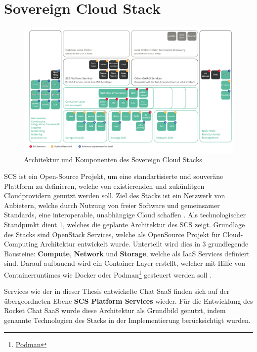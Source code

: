\section{Sovereign Cloud Stack}
\label{sec:gaia-x-einbettung:scs}

\begin{figure}[h]
  \centering
  \includegraphics[height=0.71\textwidth]{gfx/chapters/4_gaia-X/scs_architecture.png}
  \caption{Architektur und Komponenten des Sovereign Cloud Stacks}
  \label{fig:scs_architecture}
\end{figure}

\ac{SCS} ist ein Open-Source Projekt, um eine standartisierte und souveräne Plattform zu definieren, welche von 
existierenden und zukünfitgen Cloudprovidern genutzt werden soll. 
Ziel des Stacks ist ein Netzwerk von Anbietern, welche durch Nutzung von freier Software und gemeinsamer Standards,
eine interoperable, unabhängige Cloud schaffen \cite{Kagermann2021}.
Als technologischer Standpunkt dient \ref{fig:scs_architecture}, welches die geplante Architektur des \ac{SCS} zeigt. 
Grundlage des Stacks sind OpenStack Services, welche als OpenSource Projekt für Cloud-Computing Architektur entwickelt wurde.
Unterteilt wird dies in 3 grundlegende Bausteine: \textbf{Compute}, \textbf{Network} und \textbf{Storage},
welche als \ac{IaaS} Services definiert sind.
Darauf aufbauend wird ein Container Layer erstellt, welcher mit Hilfe von Containerruntimes
wie Docker oder Podman\footnote{\href{https://podman.io}{Podman}} gesteuert werden soll \cite{scs}.

Services wie der in dieser Thesis entwickelte Chat \ac{SaaS} finden sich auf der übergeordneten Ebene \textbf{SCS Platform Services} wieder.
Für die Entwicklung des Rocket Chat \ac{SaaS} wurde diese Architektur als Grundbild genutzt, indem 
genannte Technologien des Stacks in der Implementierung berücksichtigt wurden.